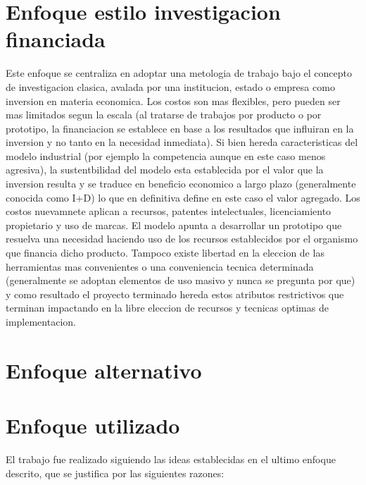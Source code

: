 \section {Enfoque estilo investigacion financiada}
Este enfoque se centraliza en adoptar una metologia de trabajo bajo el concepto
de investigacion clasica, avalada por una institucion, estado  o empresa como
inversion en materia economica. Los costos son mas flexibles, pero pueden ser
mas limitados segun la escala (al tratarse de trabajos por producto o por
prototipo, la financiacion se establece en base a los resultados que influiran
en la inversion y no tanto en la necesidad inmediata).
Si bien hereda caracteristicas del modelo industrial (por ejemplo la
competencia aunque en este caso menos agresiva), la sustentbilidad del modelo
esta establecida por el valor que la inversion resulta y se traduce en
beneficio economico a largo plazo (generalmente conocida como I+D)
lo que en definitiva define en este caso el valor agregado. Los costos
nuevamnete aplican a recursos, patentes intelectuales, licenciamiento
propietario y uso de marcas.
El modelo apunta a desarrollar un prototipo que resuelva una necesidad 
haciendo uso de los recursos establecidos por el organismo que financia dicho
producto. Tampoco existe libertad en la eleccion de las herramientas mas
convenientes o una conveniencia tecnica determinada (generalmente se adoptan
elementos de uso masivo y nunca se pregunta por que) y como resultado 
el proyecto terminado hereda estos atributos restrictivos que terminan
impactando en la libre eleccion de recursos y tecnicas optimas de
implementacion. 
\section {Enfoque alternativo}
%
% 
\section{Enfoque utilizado} 
El trabajo fue realizado siguiendo las ideas establecidas en el ultimo enfoque
descrito, que se justifica por las siguientes razones:
